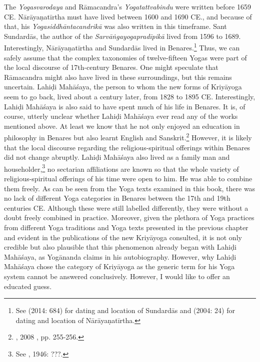 The \textit{Yogasvarodaya} and Rāmacandra's \textit{Yogatattvabindu} were written before 1659 CE. Nārāyaṇatīrtha must have lived between 1600 and 1690 CE., and because of that, his \textit{Yogasiddhāntacandrikā} was also written in this timeframe. Sant Sundardās, the author of the \textit{Sarvāṅgayogapradīpikā} lived from 1596 to 1689. Interestingly, Nārāyaṇatīrtha and Sundardās lived in Benares.\footnote{See \citeauthor{burger2014sarvangayogapradipika} (2014: 684) for dating and location of Sundardās and \citeauthor{penna2004} (2004: 24) for dating and location of Nārāyaṇatīrtha.} Thus, we can safely assume that the complex taxonomies of twelve-fifteen Yogas were part of the local discourse of 17th-century Benares. One might speculate that Rāmacandra might also have lived in these surroundings, but this remains uncertain. Lahiḍi Mahāśaya, the person to whom the new forms of Kriyāyoga seem to go back, lived about a century later, from 1828 to 1895 CE. Interestingly, Lahiḍi Mahāśaya is also said to have spent much of his life in Benares. It is, of course, utterly unclear whether Lahiḍi Mahāśaya ever read any of the works mentioned above. At least we know that he not only enjoyed an education in philosophy in Benares but also learnt English and Sanskrit.\footnote{\citeauthor{jones2008encyclopedia}, 2008 , pp. 255-256.} However, it is likely that the local discourse regarding the religious-spiritual offerings within Benares did not change abruptly. Lahiḍi Mahāśaya also lived as a family man and householder,\footnote{See \citeauthor{autobioyogi}, 1946: ???.} no sectarian affiliations are known so that the whole variety of religious-spiritual offerings of his time were open to him. He was able to combine them freely. As can be seen from the Yoga texts examined in this book, there was no lack of different Yoga categories in Benares between the 17th and 19th centuries CE. Although these were still labelled differently, they were without a doubt freely combined in practice. Moreover, given the plethora of Yoga practices from different Yoga traditions and Yoga texts presented in the previous chapter and evident in the publications of the new Kriyāyoga consulted, it is not only credible but also plausible that this phenomenon already began with Lahiḍi Mahāśaya, as Yogānanda claims in his autobiography. However, why Lahiḍi Mahāśaya chose the category of Kriyāyoga as the generic term for his Yoga system cannot be answered conclusively. However, I would like to offer an educated guess.

